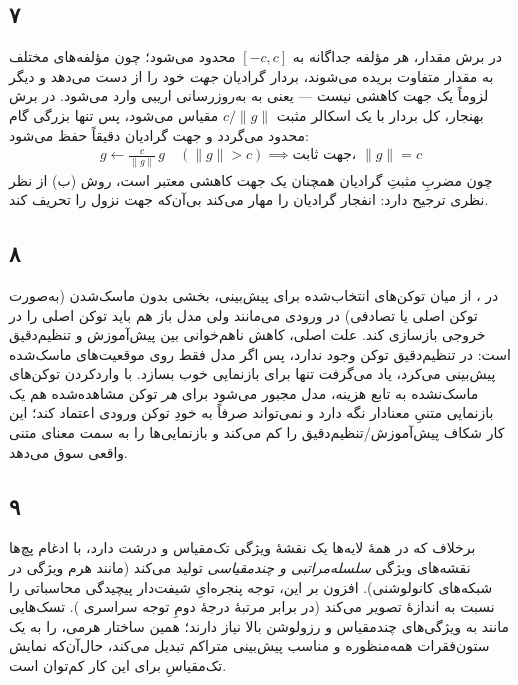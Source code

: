 \subsection*{۷}
در برش مقدار، هر مؤلفه جداگانه به $[-c,c]$ محدود می‌شود؛ چون مؤلفه‌های مختلف به مقدار متفاوت بریده می‌شوند، بردار گرادیان \emph{جهت} خود را از دست می‌دهد و دیگر لزوماً یک جهت کاهشی نیست — یعنی به به‌روزرسانی اریبی وارد می‌شود. در برش بهنجار، کل بردار با یک اسکالر مثبت $c/\|g\|$ مقیاس می‌شود، پس تنها بزرگی گام محدود می‌گردد و جهت گرادیان دقیقاً حفظ می‌شود:
\begin{align*}
g \leftarrow \frac{c}{\|g\|}\,g \quad (\|g\|>c)
\implies
\text{جهت ثابت، } \|g\|=c
\end{align*}
چون مضربِ مثبتِ گرادیان همچنان یک جهت کاهشی معتبر است، روش (ب) از نظر نظری ترجیح دارد: انفجار گرادیان را مهار می‌کند بی‌آن‌که جهت نزول را تحریف کند.

\subsection*{۸}
در
،
از میان توکن‌های انتخاب‌شده برای پیش‌بینی، بخشی بدون ماسک‌شدن (به‌صورت توکن اصلی یا تصادفی) در ورودی می‌مانند ولی مدل باز هم باید توکن اصلی را در خروجی بازسازی کند. علت اصلی، کاهش ناهم‌خوانی بین پیش‌آموزش و تنظیم‌دقیق است: در تنظیم‌دقیق توکن
\lr{[MASK]}
وجود ندارد، پس اگر مدل فقط روی موقعیت‌های ماسک‌شده پیش‌بینی می‌کرد، یاد می‌گرفت تنها برای
\lr{[MASK]}
بازنمایی خوب بسازد. با واردکردن توکن‌های ماسک‌نشده به تابع هزینه، مدل مجبور می‌شود برای \emph{هر} توکن مشاهده‌شده هم یک بازنمایی متنیِ معنادار نگه دارد و نمی‌تواند صرفاً به خودِ توکن ورودی اعتماد کند؛ این کار شکاف پیش‌آموزش/تنظیم‌دقیق را کم می‌کند و بازنمایی‌ها را به سمت معنای متنی واقعی سوق می‌دهد.

\subsection*{۹}
برخلاف
که در همهٔ لایه‌ها یک نقشهٔ ویژگی تک‌مقیاس و درشت دارد، با ادغام پچ‌ها نقشه‌های ویژگی \emph{سلسله‌مراتبی و چندمقیاسی} تولید می‌کند (مانند هرم ویژگی در شبکه‌های کانولوشنی). افزون بر این، توجه پنجره‌ایِ شیفت‌دار پیچیدگی محاسباتی را نسبت به اندازهٔ تصویر
می‌کند (در برابر مرتبهٔ درجهٔ دومِ توجه سراسری
).
تسک‌هایی مانند
به ویژگی‌های چندمقیاس و رزولوشن بالا نیاز دارند؛ همین ساختار هرمی،
را به یک ستون‌فقرات همه‌منظوره و مناسب پیش‌بینی متراکم تبدیل می‌کند، حال‌آن‌که نمایش تک‌مقیاسِ
برای این کار کم‌توان است.